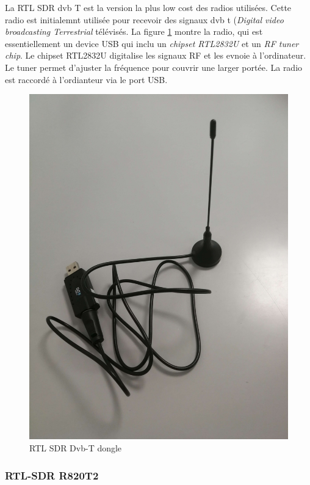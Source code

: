 La RTL SDR dvb T est la version la plus low cost des radios utilisées. Cette radio est initialemnt utilisée pour recevoir des signaux dvb t (\textit{Digital video broadcasting Terrestrial} télévisés. La figure \ref{term31} montre la radio, qui est essentiellement un device USB qui inclu un \textit{chipset RTL2832U} et un \textit{RF tuner chip}. Le chipset RTL2832U digitalise les signaux RF et les evnoie à l'ordinateur. Le tuner permet d'ajuster la fréquence pour couvrir une larger portée.
La radio est raccordé à l'ordianteur via le port USB.

\begin{figure}[h]
\centering

\includegraphics[scale=0.08]{images/dvbt.png}
\caption{RTL SDR Dvb-T dongle}\label{term31}
\end{figure}

\newpage

\subsubsection{RTL-SDR R820T2}

